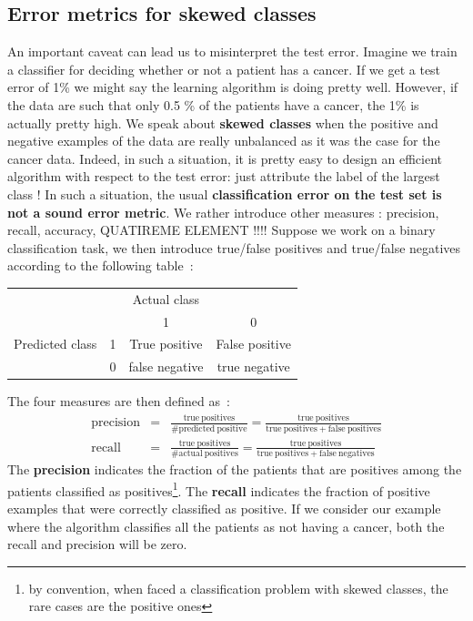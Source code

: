 \documentclass[10pt,a4paper]{article}
\begin{document}
\subsection{Error metrics for skewed classes}

An important caveat can lead us to misinterpret the test
error. Imagine we train a classifier for deciding whether or not a
patient has a cancer. If we get a test error of 1\% we might say the
learning algorithm is doing pretty well. However, if the data are such
that only 0.5 \% of the patients have a cancer, the 1\% is actually
pretty high. We speak about \textbf{skewed classes} when the positive and
negative examples of the data are really unbalanced as it was the case
for the cancer data. Indeed, in such a situation, it is pretty easy to
design an efficient algorithm with respect to the test error: just
attribute the label of the largest class ! In such a situation, the usual
\textbf{classification error on the test set is not a sound error
  metric}. We rather introduce other measures : precision, recall,
accuracy, QUATIREME ELEMENT !!!! Suppose we work on a binary
classification task, we then introduce true/false positives and
true/false negatives according to the following table~:
\begin{tabular}{cccc}
& & Actual class & \\
& & 1            & 0 \\
Predicted class & 1 & True positive & False positive \\
                & 0 & false negative & true negative \\
\end{tabular}

The four measures are then defined as~:
\begin{eqnarray}
\mathrm{precision} &=& \frac{\mathrm{true\ positives}}{\mathrm{\#predicted\
  positive}} = \frac{\mathrm{true\ positives}}{\mathrm{true\
    positives}+\mathrm{false\ positives}}\\
\mathrm{recall} &=& \frac{\mathrm{true\ positives}}{\mathrm{\#actual\
  positives}} = \frac{\mathrm{true\ positives}}{\mathrm{true\
    positives}+\mathrm{false\ negatives}}
\end{eqnarray}
The \textbf{precision} indicates the fraction of the patients that are
positives among the patients classified as positives\footnote{by
  convention, when faced a classification problem with skewed classes,
the rare cases are the positive ones}. The
\textbf{recall} indicates the fraction of positive examples that were
correctly classified as positive. If we consider our example where the
algorithm classifies all the patients as not having a cancer, both the
recall and precision will be zero.
\end{document}
